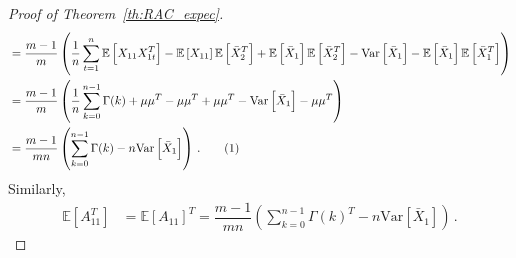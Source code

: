 \documentclass[11pt]{article}
\newcommand\numberthis{\addtocounter{equation}{1}\tag{\theequation}}
\theoremstyle{remark}
\begin{document}
\begin{proof}[Proof of Theorem~\ref{th:RAC_expec}]
\begin{align*}
    &= \dfrac{m-1}{m}\left(\dfrac{1}{n}\sum_{t=1}^{n}\mathbb{E} \left[X_{11}X_{1t}^T \right] - \mathbb{E}\left[X_{11}\right] \mathbb{E}\left[\bar{X}_2^T \right] + \mathbb{E} \left[\bar{X}_1\right]\mathbb{E}\left[\bar{X}_2^T\right] - \text{Var}\left[\bar{X}_1 \right] - \mathbb{E}\left[\bar{X}_1 \right]\mathbb{E}\left[\bar{X}_1^T \right]\right)\\
    &= \dfrac{m-1}{m}\left(\dfrac{1}{n}\sum_{k=0}^{n-1}\Gamma(k) + \mu \mu^T - \mu \mu^T + \mu \mu^T - \text{Var}\left[\bar{X}_1 \right] - \mu \mu^T\right)\\
    &= \dfrac{m-1}{mn}\left(\sum_{k=0}^{n-1}\Gamma(k) - n\text{Var}\left[\bar{X}_1 \right]\right)\,. \numberthis \label{eq:acf_2}
\end{align*}
%
Similarly,
%    
\begin{align}
\label{eq:acf_3}
    \mathbb{E} \left[ A_{11}^T \right] &= \mathbb{E}\left[ A_{11}\right]^T = \dfrac{m-1}{mn}\left(\sum_{k=0}^{n-1}\Gamma(k)^T - n\text{Var}\left[\bar{X}_1 \right] \right)\,.
\end{align}



\end{proof}
\end{document}
